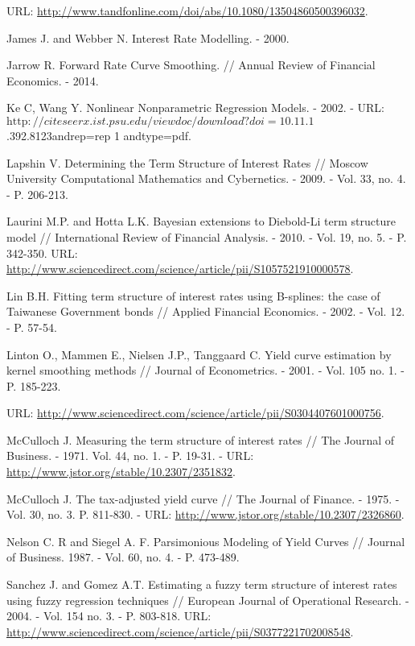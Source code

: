 \documentclass[10pt]{article}
\begin{document}
URL: \href{http://www.tandfonline.com/doi/abs/10.1080/13504860500396032}{http://www.tandfonline.com/doi/abs/10.1080/13504860500396032}.

James J. and Webber N. Interest Rate Modelling. - 2000.

Jarrow R. Forward Rate Curve Smoothing. // Annual Review of Financial Economics. - 2014.

Ke C, Wang Y. Nonlinear Nonparametric Regression Models. - 2002. - URL: $\mathrm{http}: / / c i t e s e e r x . i s t . p s u . e d u / v i e w d o c / d o w n l o a d ? d o i=10.11 .1$.392.8123andrep=rep 1 andtype=pdf.

Lapshin V. Determining the Term Structure of Interest Rates // Moscow University Computational Mathematics and Cybernetics. - 2009. - Vol. 33, no. 4. - P. 206-213.

Laurini M.P. and Hotta L.K. Bayesian extensions to Diebold-Li term structure model // International Review of Financial Analysis. - 2010. - Vol. 19, no. 5. - P. 342-350. URL: \href{http://www.sciencedirect.com/science/article/pii/S1057521910000578}{http://www.sciencedirect.com/science/article/pii/S1057521910000578}.

Lin B.H. Fitting term structure of interest rates using B-splines: the case of Taiwanese Government bonds // Applied Financial Economics. - 2002. - Vol. 12. - P. 57-54.

Linton O., Mammen E., Nielsen J.P., Tanggaard C. Yield curve estimation by kernel smoothing methods // Journal of Econometrics. - 2001. - Vol. 105 no. 1. - P. 185-223.

URL: \href{http://www.sciencedirect.com/science/article/pii/S0304407601000756}{http://www.sciencedirect.com/science/article/pii/S0304407601000756}.

McCulloch J. Measuring the term structure of interest rates // The Journal of Business. - 1971. Vol. 44, no. 1. - P. 19-31. - URL: \href{http://www.jstor.org/stable/10.2307/2351832}{http://www.jstor.org/stable/10.2307/2351832}.

McCulloch J. The tax-adjusted yield curve // The Journal of Finance. - 1975. - Vol. 30, no. 3. P. 811-830. - URL: \href{http://www.jstor.org/stable/10.2307/2326860}{http://www.jstor.org/stable/10.2307/2326860}.

Nelson C. R and Siegel A. F. Parsimonious Modeling of Yield Curves // Journal of Business. 1987. - Vol. 60, no. 4. - P. 473-489.

Sanchez J. and Gomez A.T. Estimating a fuzzy term structure of interest rates using fuzzy regression techniques // European Journal of Operational Research. - 2004. - Vol. 154 no. 3. - P. 803-818. URL: \href{http://www.sciencedirect.com/science/article/pii/S0377221702008548}{http://www.sciencedirect.com/science/article/pii/S0377221702008548}.
\end{document}
